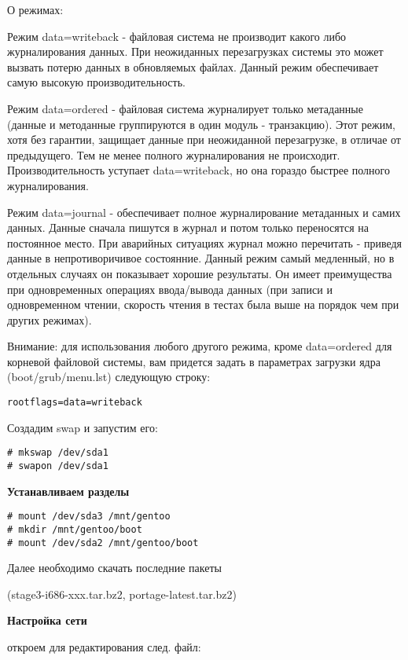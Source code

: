 \documentclass[12pt, a6paper]{article}
\begin{document}
О режимах:

Режим data=writeback - файловая система не производит какого либо журналирования данных. При неожиданных перезагрузках системы это может вызвать потерю данных в обновляемых файлах. Данный режим обеспечивает самую высокую производительность.

Режим data=ordered - файловая система журналирует только метаданные (данные и методанные группируются в один модуль - транзакцию). Этот режим, хотя без гарантии, защищает данные при неожиданной перезагрузке, в отличае от предыдущего. Тем не менее полного журналирования не происходит. Производительность уступает data=writeback, но она гораздо быстрее полного журналирования.

Режим data=journal - обеспечивает полное журналирование метаданных и самих данных. Данные сначала пишутся в журнал и потом только переносятся на постоянное место. При аварийных ситуациях журнал можно перечитать - приведя данные в непротиворичивое состоянние. Данный режим самый медленный, но в отдельных случаях он показывает хорошие результаты. Он имеет преимущества при одновременных операциях ввода/вывода данных (при записи и одновременном чтении, скорость чтения в тестах была выше на порядок чем при других режимах).


Внимание: для использования любого другого режима, кроме data=ordered для корневой файловой системы, вам придется задать в параметрах загрузки ядра (boot/grub/menu.lst) следующую строку: 

\begin{verbatim}
rootflags=data=writeback
\end{verbatim}


Создадим swap и запустим его:

\begin{verbatim}
# mkswap /dev/sda1
# swapon /dev/sda1
\end{verbatim}

{\bf Устанавливаем разделы}

\begin{verbatim}
# mount /dev/sda3 /mnt/gentoo
# mkdir /mnt/gentoo/boot
# mount /dev/sda2 /mnt/gentoo/boot
\end{verbatim}

Далее необходимо скачать последние пакеты 

(stage3-i686-xxx.tar.bz2, portage-latest.tar.bz2)

{\bf Настройка сети}

откроем для редактирования след. файл:
\end{document}
